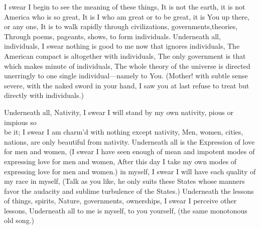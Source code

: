\documentclass[11pt]{book}
\newenvironment {poem} [1]
 {\titulus{#1}%
  \versus
  \Nstanza{0}%
  \numerus{1}}
 {\endversus}
\begin{document}
\begin{poem}{By Blue Ontario's Shore}
\stropha %

I swear I begin to see the meaning of these things,
It is not the earth, it is not America who is so great,
It is I who am great or to be great, it is You up there, or any one,
It is to walk rapidly through civilizations, governments,theories,
Through poems, pageants, shows, to form individuals.
     \vacua
Underneath all, individuals,
I swear nothing is good to me now that ignores individuals,
The American compact is altogether with individuals,
The only government is that which makes minute of individuals,
The whole theory of the universe is directed unerringly to one %
    single individual---namely to You.
     \vacua
(Mother! with subtle sense severe, with the naked sword in your hand,
I saw you at last refuse to treat but directly with individuals.)

\stropha %

Underneath all, Nativity,
I swear I will stand by my own nativity, pious or impious so\\be it;
I swear I am charm'd with nothing except nativity,
Men, women, cities, nations, are only beautiful from nativity.
     \vacua
Underneath all is the Expression of love for men and women,
(I swear I have seen enough of mean and impotent modes of expressing %
    love for men and women,
After this day I take my own modes of expressing love for men and %
    women.) in myself,
     \vacua
I swear I will have each quality of my race in myself,
(Talk as you like, he only suits these States whose manners favor %
    the audacity and sublime turbulence of the States.)
     \vacua
Underneath the lessons of things, spirits, Nature, governments, %
    ownerships, I swear I perceive other lessons,
Underneath all to me is myself, to you yourself, (the same %
    monotonous old song.)

\stropha %


\end{poem}
\end{document}

